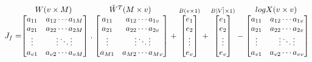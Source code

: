 \[J_{f}=\stackrel{\mbox{$W(v\times M)$ }}{%
    \begin{bmatrix}
    a_{11} & a_{12}  \cdots  a_{1M} \\
    a_{21} & a_{22}  \cdots  a_{2M} \\
    \vdots & \vdots  \ddots  \vdots \\
    a_{v1} & a_{v2}  \cdots  a_{vM}
    \end{bmatrix}%
  } .
  \stackrel{\mbox{$\tilde{W}^T(M \times v)$ }}{%
    \begin{bmatrix}
    a_{11} & a_{12}  \cdots  a_{1v} \\
    a_{21} & a_{22}  \cdots  a_{2v} \\
    \vdots & \vdots  \ddots  \vdots \\
    a_{M1} & a_{M2}  \cdots  a_{Mv}
    \end{bmatrix}%
  } +
  \stackrel{B( v \times 1)}{%
    \begin{bmatrix}
    e_1 \\
    e_2 \\
    \vdots \\
    e_{v}
    \end{bmatrix}%
   }
   +
  \stackrel{\tilde{B |V|\times 1)}}{%
    \begin{bmatrix}
    e_1 \\
    e_2 \\
    \vdots \\
    e_{v}
    \end{bmatrix}%
   }-
   \stackrel{\mbox{$logX(v \times v)$ }}{%
    \begin{bmatrix}
    a_{11} & a_{12}  \cdots  a_{1v} \\
    a_{21} & a_{22}  \cdots  a_{2v} \\
    \vdots & \vdots  \ddots  \vdots \\
    a_{v1} & a_{v2}  \cdots  a_{vv}
    \end{bmatrix}%
  }
\]
\\
